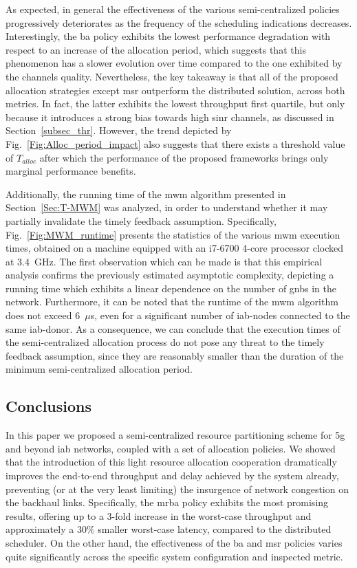 As expected, in general the effectiveness of the various semi-centralized policies progressively deteriorates as the frequency of the scheduling indications decreases. Interestingly, the \gls{ba} policy exhibits the lowest performance degradation with respect to an increase of the allocation period, which suggests that this phenomenon has a slower evolution over time compared to the one exhibited by the channels quality. Nevertheless, the key takeaway is that all of the proposed allocation strategies except \gls{msr} outperform the distributed solution, across both metrics. In fact, the latter exhibits the lowest throughput first quartile, but only because it introduces a strong bias towards high \gls{sinr} channels, as discussed in Section~\ref{subsec_thr}. However, the trend depicted by Fig.~\ref{Fig:Alloc_period_impact} also suggests that there exists a threshold value of $T_{alloc}$ after which the performance of the proposed frameworks brings only marginal performance benefits.

Additionally, the running time of the \gls{mwm} algorithm presented in Section~\ref{Sec:T-MWM} was analyzed, in order to understand whether it may partially invalidate the timely feedback assumption. Specifically, Fig.~\ref{Fig:MWM_runtime} presents the statistics of the various \gls{mwm} execution times, obtained on a machine equipped with an i7-6700 4-core processor clocked at 3.4~{GHz}. 
The first observation which can be made is that this empirical analysis confirms the previously estimated asymptotic complexity, depicting a running time which exhibits a linear dependence on the number of \glspl{gnb} in the network. Furthermore, it can be noted that the runtime of the \gls{mwm} algorithm does not exceed 6~$\mu$s, even for a significant number of \gls{iab}-nodes connected to the same \gls{iab}-donor. As a consequence, we can conclude that the execution times of the semi-centralized allocation process do not pose any threat to the timely feedback assumption, since they are reasonably smaller than the duration of the minimum semi-centralized allocation period. 

\subsection{Conclusions}
\label{Sec:conc}

In this paper we proposed a semi-centralized resource partitioning scheme for \gls{5g} and beyond \gls{iab} networks, coupled with a set of allocation policies. We showed that the introduction of this light resource allocation cooperation dramatically improves the end-to-end throughput and delay achieved by the system already, preventing (or at the very least limiting) the insurgence of network congestion on the backhaul links. Specifically, the \gls{mrba} policy exhibits the most promising results, offering up to a 3-fold increase in the worst-case throughput and approximately a 30\% smaller worst-case latency, compared to the distributed scheduler. On the other hand, the effectiveness of the \gls{ba} and \gls{msr} policies varies quite significantly across the specific system configuration and inspected metric. %

